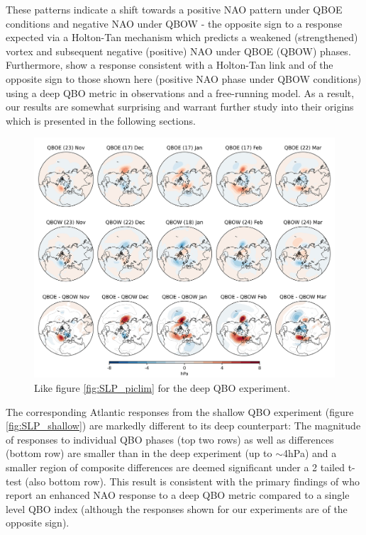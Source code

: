 These patterns indicate a shift towards a positive NAO pattern under QBOE conditions and negative NAO under QBOW - the opposite sign to a response expected via a Holton-Tan mechanism which predicts a weakened (strengthened) vortex and subsequent negative (positive) NAO under QBOE (QBOW) phases. Furthermore, \cite{andrewsObserved2019d} show a response consistent with a Holton-Tan link and of the opposite sign to those shown here (positive NAO phase under QBOW conditions) using a deep QBO metric in observations and a free-running model. As a result, our results are somewhat surprising and warrant further study into their origins which is presented in the following sections.

\begin{figure}[h!]
\begin{center}
\noindent\includegraphics[width =0.8\linewidth]{Figures/Figures-deepQBO/SLP_composites_individual_months_QBO_phases_U_d_higher_50hPa_5thresh.png}
\caption[MSLP composites under different QBO phases in the deep QBO simulation]{Like figure \ref{fig:SLP_piclim} for the deep QBO experiment.}
\label{fig:SLP_deep}
\end{center}
\end{figure}

The corresponding Atlantic responses from the shallow QBO experiment (figure \ref{fig:SLP_shallow}) are markedly different to its deep counterpart: The magnitude of responses to individual QBO phases (top two rows) as well as differences (bottom row) are smaller than in the deep experiment (up to $\sim$4hPa) and a smaller region of composite differences are deemed significant under a 2 tailed t-test (also bottom row). This result is consistent with the primary findings of \cite{andrewsObserved2019d} who report an enhanced NAO response to a deep QBO metric compared to a single level QBO index (although the responses shown for our experiments are of the opposite sign).

